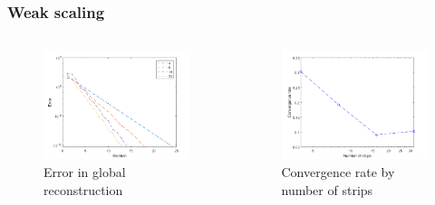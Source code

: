 \documentclass{beamer}
\begin{document}
\begin{frame}
\frametitle{Weak scaling}

\begin{columns}
	\begin{column}{0.5\textwidth}
		\begin{figure}
			\includegraphics[width=\textwidth]{FIG/MTLB_strips_weak_error.png}
			\caption{Error in global reconstruction}
		\end{figure}
	\end{column}
	\begin{column}{0.5\textwidth}
		\begin{figure}
			\includegraphics[width=\textwidth]{FIG/MTLB_strips_weak_conv.png}
			\caption{Convergence rate by number of strips}
		\end{figure}
	\end{column}
\end{columns}

\end{frame}
\end{document}
